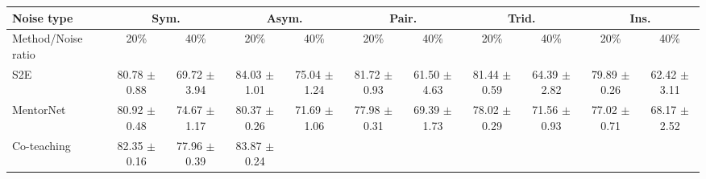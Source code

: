 \documentclass[11pt]{article}
\begin{document}
\begin{table}[!htbp]
    \small
\centering
	\begin{tabular}{l |cc|cc|cc|cc|cc} 
		\Xhline{3\arrayrulewidth}	 	
		   Noise type &\multicolumn{2}{c|}{Sym.}&\multicolumn{2}{c|}{Asym.}&\multicolumn{2}{c|}{Pair.}&\multicolumn{2}{c|}{Trid.}&\multicolumn{2}{c}{Ins.}\\
			\hline
		   Method/Noise ratio&  20\% & 40\%& 20\% & 40\% &20\% & 40\%& 20\% & 40\% & 20\% & 40\%\\
			\hline
			S2E & \makecell{80.78\\ $\pm$\scriptsize{0.88}}
			& \makecell{69.72\\ $\pm$\scriptsize{3.94}}
			& \makecell{84.03\\ $\pm$\scriptsize{1.01}}
			& \makecell{75.04\\ $\pm$\scriptsize{1.24}}
			& \makecell{81.72\\ $\pm$\scriptsize{0.93}}
			& \makecell{61.50\\ $\pm$\scriptsize{4.63}}
			& \makecell{81.44\\ $\pm$\scriptsize{0.59}}
			& \makecell{64.39\\ $\pm$\scriptsize{2.82}}
			& \makecell{79.89\\ $\pm$\scriptsize{0.26}}
			& \makecell{62.42\\ $\pm$\scriptsize{3.11}}\\
			\hline
			MentorNet & \makecell{80.92\\ $\pm$\scriptsize{0.48}} 
			& \makecell{74.67\\ $\pm$\scriptsize{1.17}}
			& \makecell{80.37\\ $\pm$\scriptsize{0.26}}
			& \makecell{71.69\\ $\pm$\scriptsize{1.06}}
			& \makecell{77.98\\ $\pm$\scriptsize{0.31}}
			& \makecell{69.39\\ $\pm$\scriptsize{1.73}}
			& \makecell{78.02\\ $\pm$\scriptsize{0.29}}
			& \makecell{71.56\\ $\pm$\scriptsize{0.93}}
			& \makecell{77.02\\ $\pm$\scriptsize{0.71}}
			& \makecell{68.17\\ $\pm$\scriptsize{2.52}}
			\\
			\hline
			Co-teaching & \makecell{82.35\\ $\pm$\scriptsize{0.16}} 
			& \makecell{77.96\\ $\pm$\scriptsize{0.39}}
			& \makecell{83.87\\ $\pm$\scriptsize{0.24}}

\end{tabular}
\end{table}
\end{document}
